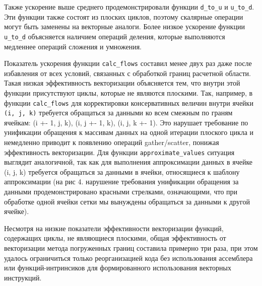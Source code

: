 Также ускорение выше среднего продемонстрировали функции \texttt{d\_to\_u} и \texttt{u\_to\_d}.
Эти функции также состоят из плоских циклов, поэтому скалярные операции могут быть заменены на векторные аналоги.
Более низкое ускорение функции \texttt{u\_to\_d} объясняется наличием операций деления, которые выполняются медленнее операций сложения и умножения.

Показатель ускорения функции \texttt{calc\_flows} составил менее двух раз даже после избавления от всех условий, связанных с обработкой границ расчетной области.
Такая низкая эффективность векторизации объясняется тем, что внутри этой функции присутствуют циклы, которые не являются плоскими.
Так, например, в функции \texttt{calc\_flows} для корректировки консервативных величин внутри ячейки \texttt{(i, j, k)} требуется обращаться за данными ко всем смежным по граням ячейкам: (i +- 1, j, k), (i, j +- 1, k), (i, j, k +- 1).
Это нарушает требование по унификации обращения к массивам данных на одной итерации плоского цикла и немедленно приводит к появлению операций gather/scatter, понижая эффективность векторизации.
Для функции \texttt{approximate\_values} ситуация выглядит аналогичной, так как для выполнения аппроксимации данных в ячейке (i, j, k) требуется обращаться за данными в ячейки, относящиеся к шаблону аппроксимации (на рис 4. нарушение требования унификации обращения за данными продемонстрировано красными стрелками, означающими, что при обработке одной ячейки сетки мы вынуждены обращаться за данными к другой ячейке).

Несмотря на низкие показатели эффективности векторизации функций, содержащих циклы, не являющиеся плоскими, общая эффективность от векторизации метода погруженных границ составила примерно три раза, при этом удалось ограничиться только реорганизацией кода без использования ассемблера или функций-интринсиков для формированного использования векторных инструкций.
